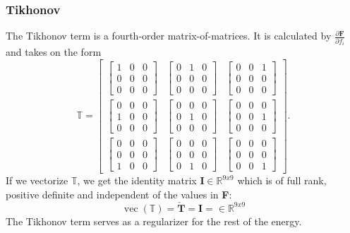 \subsubsection{Tikhonov}
The Tikhonov term is a fourth-order matrix-of-matrices. It is calculated by $\frac{\partial \mathbf{F}}{\partial f_i}$ and takes on the form
\[
\mathbb{T} = \left[\begin{array}{ccc}{\begin{bmatrix} 1 & 0 & 0 \\ 0 & 0 & 0 \\ 0 & 0 & 0 \end{bmatrix}} & {\begin{bmatrix} 0 & 1 & 0 \\ 0 & 0 & 0 \\ 0 & 0 & 0 \end{bmatrix}} & {\begin{bmatrix} 0 & 0 & 1 \\ 0 & 0 & 0 \\ 0 & 0 & 0 \end{bmatrix}} \\ {\begin{bmatrix} 0 & 0 & 0 \\ 1 & 0 & 0 \\ 0 & 0 & 0 \end{bmatrix}} & {\begin{bmatrix} 0 & 0 & 0 \\ 0 & 1 & 0 \\ 0 & 0 & 0 \end{bmatrix}} & {\begin{bmatrix} 0 & 0 & 0 \\ 0 & 0 & 1 \\ 0 & 0 & 0 \end{bmatrix}} \\ {\begin{bmatrix} 0 & 0 & 0 \\ 0 & 0 & 0 \\ 1 & 0 & 0 \end{bmatrix}} & {\begin{bmatrix} 0 & 0 & 0 \\ 0 & 0 & 0 \\ 0 & 1 & 0 \end{bmatrix}} & {\begin{bmatrix} 0 & 0 & 0 \\ 0 & 0 & 0 \\ 0 & 0 & 1 \end{bmatrix}} \end{array}\right].
\]
If we vectorize $\mathbb{T}$, we get the identity matrix $\mathbf{I} \in \mathbb{R}^{9x9}$ which is of full rank, positive definite and independent of the values in \textbf{F}: 
\[
\operatorname{vec}(\mathbb{T}) =  \mathbf{\check{T}} = \mathbf{I} = \in \mathbb{R}^{9x9}
\]
The Tikhonov term serves as a regularizer for the rest of the energy.

